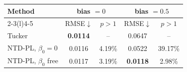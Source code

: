 \begin{tabular}{@{}lcccc@{}}
\toprule
\multirow{2}{*}{Method} &
\multicolumn{2}{c}{bias $=0$} &
\multicolumn{2}{c}{bias $=0.5$} \\
\cmidrule(lr){2-3}\cmidrule(l){4-5}
& RMSE$\downarrow$ & $p>1$ &
  RMSE$\downarrow$ & $p>1$ \\
\midrule
Tucker & \textbf{0.0114} & -- &
0.0647 & -- \\
NTD-PL, $\beta_0=0$ & 0.0116 & 4.19\% &
0.0522 & 39.17\% \\
NTD-PL, $\beta_0$ free & 0.0117 & 3.19\% &
\textbf{0.0118} & 2.98\% \\
\bottomrule
\end{tabular}
